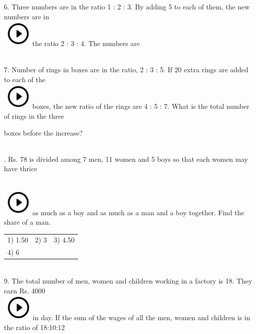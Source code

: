 \documentclass{article}
\begin{document}
6.   Three numbers are in the ratio 1 : 2 : 3. By adding 5 to each of them, the new numbers are in  
	\noindent \\ \includegraphics*[width=0.60in, height=0.52in]{images/image1}the ratio 2 : 3 : 4. The numbers are

\noindent  \\  

7.   Number of rings in boxes are in the ratio, 2 : 3 : 5. If 20 extra rings are added to each of the  
	\noindent \\ \includegraphics*[width=0.60in, height=0.52in]{images/image1}boxes, the new ratio of the rings are 4 : 5 : 7. What is the total number of rings in the three

\noindent boxes before the increase?

\noindent 

\noindent  \\  

.   Rs. 78 is divided among 7 men, 11 women and 5 boys so that each women may have thrice

\noindent  
	\noindent \\ \includegraphics*[width=0.60in, height=0.52in]{images/image1}as much as a boy and as much as a man and a boy together. Find the share of a man.

\noindent \begin{tabular}{p{1.7in} p{1.6in} p{1.6in}} \\ 
 1) 1.50                     &  2) 3                   &  3) 4.50              \\
4) 6 \\
\end{tabular}

\noindent  \\  

9.   The total number of men, women and children working in a factory is 18. They earn Rs. 4000  
	\noindent \\ \includegraphics*[width=0.61in, height=0.52in]{images/image1}in day. If the sum of the wages of all the men, women and children is in the ratio of 18:10:12
\end{document}
